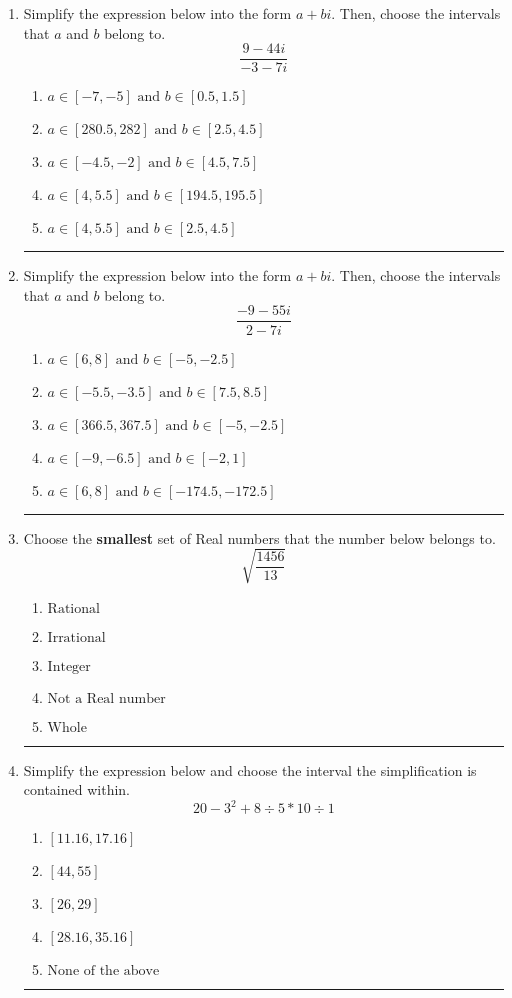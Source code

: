 \documentclass[14pt]{extbook}
\newcommand{\litem}[1]{\item#1\hspace*{-1cm}\rule{\textwidth}{0.4pt}}
\begin{document}
\begin{enumerate}
{\begin{enumerate}[label=\Alph*.]
\end{enumerate} }
\litem{
Simplify the expression below into the form $a+bi$. Then, choose the intervals that $a$ and $b$ belong to.\[ \frac{9 - 44 i}{-3 - 7 i} \]\begin{enumerate}[label=\Alph*.]
\item \( a \in [-7, -5] \text{ and } b \in [0.5, 1.5] \)
\item \( a \in [280.5, 282] \text{ and } b \in [2.5, 4.5] \)
\item \( a \in [-4.5, -2] \text{ and } b \in [4.5, 7.5] \)
\item \( a \in [4, 5.5] \text{ and } b \in [194.5, 195.5] \)
\item \( a \in [4, 5.5] \text{ and } b \in [2.5, 4.5] \)

\end{enumerate} }
\litem{
Simplify the expression below into the form $a+bi$. Then, choose the intervals that $a$ and $b$ belong to.\[ \frac{-9 - 55 i}{2 - 7 i} \]\begin{enumerate}[label=\Alph*.]
\item \( a \in [6, 8] \text{ and } b \in [-5, -2.5] \)
\item \( a \in [-5.5, -3.5] \text{ and } b \in [7.5, 8.5] \)
\item \( a \in [366.5, 367.5] \text{ and } b \in [-5, -2.5] \)
\item \( a \in [-9, -6.5] \text{ and } b \in [-2, 1] \)
\item \( a \in [6, 8] \text{ and } b \in [-174.5, -172.5] \)

\end{enumerate} }
\litem{
Choose the \textbf{smallest} set of Real numbers that the number below belongs to.\[ \sqrt{\frac{1456}{13}} \]\begin{enumerate}[label=\Alph*.]
\item \( \text{Rational} \)
\item \( \text{Irrational} \)
\item \( \text{Integer} \)
\item \( \text{Not a Real number} \)
\item \( \text{Whole} \)

\end{enumerate} }
\litem{
Simplify the expression below and choose the interval the simplification is contained within.\[ 20 - 3^2 + 8 \div 5 * 10 \div 1 \]\begin{enumerate}[label=\Alph*.]
\item \( [11.16, 17.16] \)
\item \( [44, 55] \)
\item \( [26, 29] \)
\item \( [28.16, 35.16] \)
\item \( \text{None of the above} \)


\end{enumerate}}
\end{enumerate}
\end{document}
